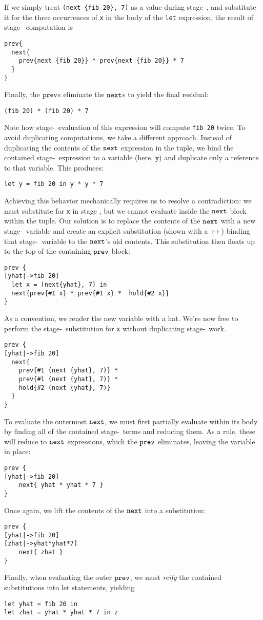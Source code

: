 If we simply treat \verb|(next {fib 20}, 7)| as a value during stage~\bbone, and
substitute it for the three occurrences of \verb|x| in the body of the
\verb|let| expression, the result of stage \bbone\ computation is
\begin{lstlisting} 
prev{
  next{ 
    prev{next {fib 20}} * prev{next {fib 20}} * 7 
  }
}
\end{lstlisting}
Finally, the ${\tt prev}$s eliminate the ${\tt next}$s to yield the final residual:
\begin{lstlisting} 
(fib 20) * (fib 20) * 7
\end{lstlisting}
Note how stage-\bbtwo\ evaluation of this expression will compute \verb|fib 20| twice.  
To avoid duplicating computations, we take a different approach.  Instead of
duplicating the contents of the ${\tt next}$ expression in the tuple, we bind the contained stage-\bbtwo\ expression to
a variable (here, $\mathtt{y}$) and duplicate only a reference to that variable.
This produces:
\begin{lstlisting} 
let y = fib 20 in y * y * 7
\end{lstlisting}

Achieving this behavior mechanically requires us to resolve a contradiction:
we must substitute for \texttt{x} in stage \bbone, but we cannot evaluate inside the ${\tt next}$ block within the tuple. 
Our solution is to replace the contents of the ${\tt next}$ with a new stage-\bbtwo\ variable and create an explicit substitution (shown with a $\mapsto$) binding that stage-\bbtwo\ variable to the ${\tt next}$'s old contents.  
This substitution then floats up to the top of the containing ${\tt prev}$ block:
\begin{lstlisting} 
prev {
[yhat|->fib 20]
  let x = (next{yhat}, 7) in
  next{prev{#1 x} * prev{#1 x} *  hold{#2 x}}
}
\end{lstlisting}
As a convention, we render the new variable with a %
hat.  We're now free to perform the stage-\bbone~substitution for {\tt x} without duplicating stage-\bbtwo\ work.
\begin{lstlisting} 
prev {
[yhat|->fib 20]
  next{
    prev{#1 (next {yhat}, 7)} * 
    prev{#1 (next {yhat}, 7)} *
    hold{#2 (next {yhat}, 7)}
  }
}
\end{lstlisting}
To evaluate the outermost ${\tt next}$, we must first partially evaluate within its body by finding all of the contained stage-\bbone~terms and reducing them. 
As a rule, these will reduce to ${\tt next}$ expressions, which the ${\tt prev}$ eliminates, leaving the variable in place:
\begin{lstlisting} 
prev {
[yhat|->fib 20]
    next{ yhat * yhat * 7 }
}
\end{lstlisting}
Once again, we lift the contents of the ${\tt next}$ into a substitution:
\begin{lstlisting} 
prev {
[yhat|->fib 20]
[zhat|->yhat*yhat*7]
    next{ zhat }
}
\end{lstlisting}
Finally, when evaluating the outer ${\tt prev}$, we must {\em reify} the contained substitutions into let statements, yielding
\begin{lstlisting} 
let yhat = fib 20 in
let zhat = yhat * yhat * 7 in z
\end{lstlisting}

